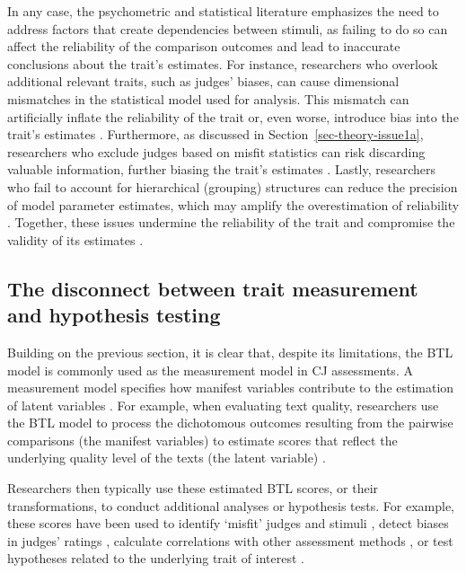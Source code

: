 \documentclass[
  authoryear,
  preprint,
  1p]{elsarticle}
\begin{document}
In any case, the psychometric and statistical literature emphasizes the
need to address factors that create dependencies between stimuli, as
failing to do so can affect the reliability of the comparison outcomes
and lead to inaccurate conclusions about the trait's estimates. For
instance, researchers who overlook additional relevant traits, such as
judges' biases, can cause dimensional mismatches in the statistical
model used for analysis. This mismatch can artificially inflate the
reliability of the trait \citep[pp.~341]{Hoyle_et_al_2023} or, even
worse, introduce bias into the trait's estimates \citep{Ackerman_1989}.
Furthermore, as discussed in Section~\ref{sec-theory-issue1a},
researchers who exclude judges based on misfit statistics can risk
discarding valuable information, further biasing the trait's estimates
\citep[chap.~12]{Zimmerman_1994, McElreath_2020}. Lastly, researchers
who fail to account for hierarchical (grouping) structures can reduce
the precision of model parameter estimates, which may amplify the
overestimation of reliability \citep[pp.~482]{Hoyle_et_al_2023}.
Together, these issues undermine the reliability of the trait and
compromise the validity of its estimates
\citep[pp.~2]{Perron_et_al_2015}.

\subsection{The disconnect between trait measurement and hypothesis
testing}\label{sec-theory-issue2}

Building on the previous section, it is clear that, despite its
limitations, the BTL model is commonly used as the measurement model in
CJ assessments. A measurement model specifies how manifest variables
contribute to the estimation of latent variables
\citep{Everitt_et_al_2010}. For example, when evaluating text quality,
researchers use the BTL model to process the dichotomous outcomes
resulting from the pairwise comparisons (the manifest variables) to
estimate scores that reflect the underlying quality level of the texts
(the latent variable)
\citep{Laming_2004, Pollitt_2012b, Whitehouse_2012, vanDaal_et_al_2016, Lesterhuis_2018_thesis, Coertjens_et_al_2017, Goossens_et_al_2018, Bouwer_et_al_2023}.

Researchers then typically use these estimated BTL scores, or their
transformations, to conduct additional analyses or hypothesis tests. For
example, these scores have been used to identify `misfit' judges and
stimuli \citep{Pollitt_2012b, vanDaal_et_al_2016, Goossens_et_al_2018},
detect biases in judges' ratings
\citep{Pollitt_et_al_2003, Pollitt_2012b}, calculate correlations with
other assessment methods \citep{Goossens_et_al_2018, Bouwer_et_al_2023},
or test hypotheses related to the underlying trait of interest
\citep{Bramley_et_al_2019, Boonen_et_al_2020, Bouwer_et_al_2023, vanDaal_et_al_2017, Jones_et_al_2019, Gijsen_et_al_2021}.
\end{document}
